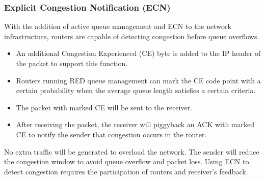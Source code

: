 \documentclass{beamer}
\begin{document}
\begin{frame}
\frametitle{Explicit Congestion Notification (ECN)}
With the addition of active queue management and ECN to the network infrastructure, routers are capable of detecting congestion before queue overflows. 
\begin{itemize}
\item An additional Congestion Experienced (CE) byte is added to the IP header of the packet to support this function.
\item Routers running RED queue management can mark the CE code point with a certain probability when the average queue length satisfies a certain criteria.
\item The packet with marked CE will be sent to the receiver.
\item After receiving the packet, the receiver will piggyback an ACK with marked CE to notify the sender that congestion occurs in the router.
\end{itemize}   
No extra traffic will be generated to overload the network. The sender will reduce the congestion window to avoid queue overflow and packet loss. Using ECN to detect congestion requires the participation of routers and receiver's feedback.
\end{frame}
\end{document}
